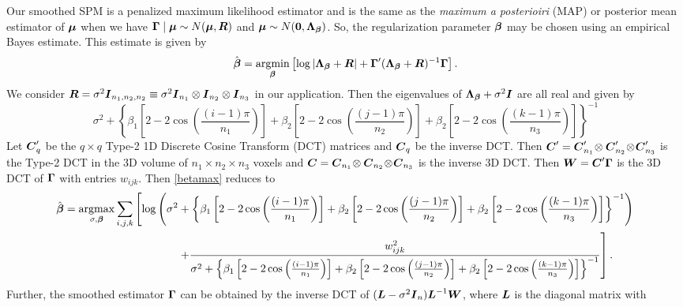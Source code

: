Our smoothed SPM is  a penalized maximum likelihood estimator and is
the same as the {\em maximum a posterioiri} (MAP) or 
posterior mean estimator of $\boldsymbol{\mu}$ when we have $\boldsymbol{\Gamma}\mid\boldsymbol{\mu} \sim
N(\boldsymbol{\mu},\boldsymbol{R})$ and $\boldsymbol{\mu}\sim N(\boldsymbol{0},\boldsymbol{\Lambda}_{\boldsymbol{\beta}})$. So, the
regularization parameter $\boldsymbol{\beta}$ may be chosen using an empirical
Bayes estimate. This estimate is given by
\begin{equation}
\hat{\boldsymbol{\beta}} = \operatorname*{argmin}_{\boldsymbol{\beta}} \left[\log|\boldsymbol{\Lambda}_{\boldsymbol{\beta}} + \boldsymbol{R}|
  + \boldsymbol{\Gamma}'(\boldsymbol{\Lambda}_{\boldsymbol{\beta}} + \boldsymbol{R})^{-1}\boldsymbol{\Gamma}\right].
\label{betamax}
\end{equation}
We consider $\boldsymbol{R} = \sigma^2\boldsymbol{I}_{n_1,n_2,n_2}
\equiv\sigma^2\boldsymbol{I}_{n_1}\otimes\boldsymbol{I}_{n_2}\otimes\boldsymbol{I}_{n_3}$ in our application.
 Then the eigenvalues of
$\boldsymbol{\Lambda}_{\boldsymbol{\beta}}+\sigma^2\boldsymbol{I}$ are all real and given by
\begin{equation}
\sigma^2 + \left\{\beta_1\left[2-2\cos\left(\frac{(i-1)\pi}{n_1}\right)\right] +
\beta_2 \left[2-2\cos\left(\frac{(j-1)\pi}{n_2}\right)\right]  +
\beta_2 \left[2-2\cos\left(\frac{(k-1)\pi}{n_3}\right)\right]\right\}^{-1}
\label{eigens}
\end{equation}
Let $\boldsymbol{C}_q'$ be the $q\times q$ Type-2 1D Discrete Cosine Transform
(DCT) matrices and $\boldsymbol{C}_q$ be the inverse DCT. Then $\boldsymbol{C}'=\boldsymbol{C}'_{n_1}\!\otimes
\boldsymbol{C}'_{n_2}\!\otimes\!\boldsymbol{C}'_{n_3}$ is the Type-2 DCT in the 3D volume of
$n_1\times n_2\times n_3$ voxels and $\boldsymbol{C}=\boldsymbol{C}_{n_1}\!\otimes
\boldsymbol{C}_{n_2}\!\otimes\!\boldsymbol{C}_{n_3}$ is the inverse 3D DCT. Then
$\boldsymbol{W} = \boldsymbol{C}'\boldsymbol{\Gamma}$ is the 3D DCT of $\boldsymbol{\Gamma}$ with entries
$w_{ijk}$. Then \eqref{betamax} reduces to
\begin{equation}
  \begin{split}
    \hat\bbeta  =  \argmax_{\sigma,\bbeta}
    \sum_{i,j,k} &\left[ \log\left(\sigma^2 + \left\{\beta_1\left[2-2\cos\left(\frac{(i-1)\pi}{n_1}\right)\right] +
\beta_2 \left[2-2\cos\left(\frac{(j-1)\pi}{n_2}\right)\right]  +
\beta_2 \left[2-2\cos\left(\frac{(k-1)\pi}{n_3}\right)\right]\right\}^{-1}
\right)\right.\\
&\qquad\qquad\left.
+ \frac{w^2_{ijk}}{\sigma^2 + \left\{\beta_1\left[2-2\cos\left(\frac{(i-1)\pi}{n_1}\right)\right] +
\beta_2 \left[2-2\cos\left(\frac{(j-1)\pi}{n_2}\right)\right]  +
\beta_2 \left[2-2\cos\left(\frac{(k-1)\pi}{n_3}\right)\right]\right\}^{-1}
}
\right].
\end{split}
\end{equation}
Further, the smoothed estimator $\boldsymbol{\Gamma}$ can be obtained by the inverse DCT 
of $(\boldsymbol{L} -\sigma^2\boldsymbol{I}_n)\boldsymbol{L}^{-1}\boldsymbol{W}$, where $\boldsymbol{L}$ is the diagonal matrix with
